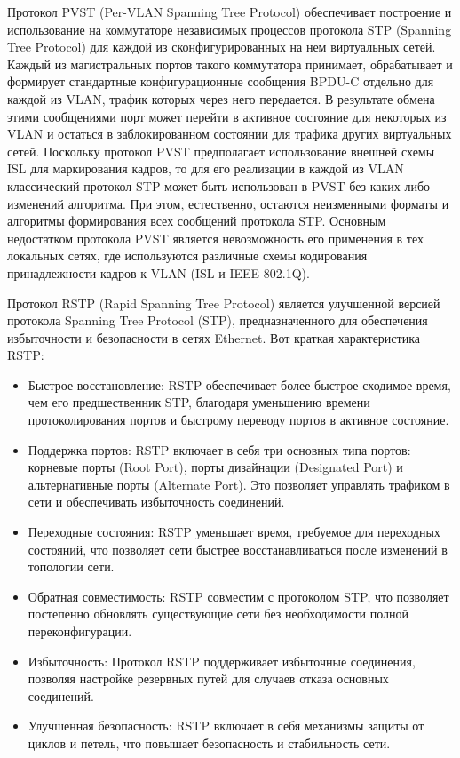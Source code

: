 Протокол PVST (Per-VLAN Spanning Tree Protocol) обеспечивает
построение и использование на коммутаторе независимых процессов
протокола STP (Spanning Tree Protocol) для каждой из
сконфигурированных на нем виртуальных сетей. Каждый из
магистральных портов такого коммутатора принимает, обрабатывает и
формирует стандартные конфигурационные сообщения BPDU-C отдельно
для каждой из VLAN, трафик которых через него передается. В результате
обмена этими сообщениями порт может перейти в активное состояние для
некоторых из VLAN и остаться в заблокированном состоянии для трафика
других виртуальных сетей. Поскольку протокол PVST предполагает
использование внешней схемы ISL для маркирования кадров, то для его
реализации в каждой из VLAN классический протокол STP может быть
использован в PVST без каких-либо изменений алгоритма. При этом,
естественно, остаются неизменными форматы и алгоритмы формирования
всех сообщений протокола STP. Основным недостатком протокола PVST
является невозможность его применения в тех локальных сетях, где
используются различные схемы кодирования принадлежности кадров к
VLAN (ISL и IEEE 802.1Q).

Протокол RSTP (Rapid Spanning Tree Protocol) является улучшенной
версией протокола Spanning Tree Protocol (STP), предназначенного для
обеспечения избыточности и безопасности в сетях Ethernet. Вот краткая
характеристика RSTP:

\begin{itemize}
    \item Быстрое восстановление: RSTP обеспечивает более быстрое
    сходимое время, чем его предшественник STP, благодаря
    уменьшению времени протоколирования портов и быстрому
    переводу портов в активное состояние.
    \item Поддержка портов: RSTP включает в себя три основных типа
    портов: корневые порты (Root Port), порты дизайнации (Designated
    Port) и альтернативные порты (Alternate Port). Это позволяет
    управлять трафиком в сети и обеспечивать избыточность
    соединений.
    \item Переходные состояния: RSTP уменьшает время, требуемое для
    переходных состояний, что позволяет сети быстрее
    восстанавливаться после изменений в топологии сети.
    \item Обратная совместимость: RSTP совместим с протоколом STP, что
    позволяет постепенно обновлять существующие сети без
    необходимости полной переконфигурации.
    \item Избыточность: Протокол RSTP поддерживает избыточные
    соединения, позволяя настройке резервных путей для случаев отказа
    основных соединений.
    \item Улучшенная безопасность: RSTP включает в себя механизмы
    защиты от циклов и петель, что повышает безопасность и
    стабильность сети.
\end{itemize}

